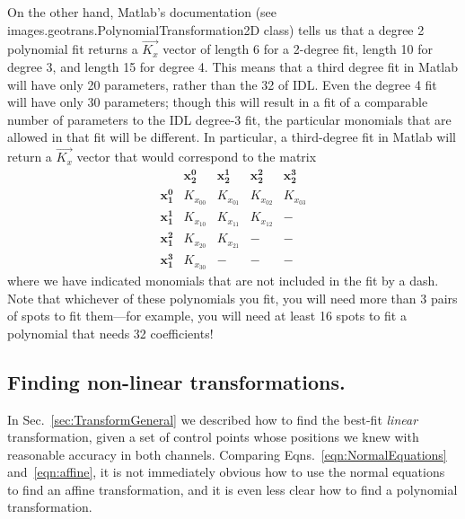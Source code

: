 \documentclass[11pt]{article}
\begin{document}
On the other hand, Matlab's documentation (see images.geotrans.PolynomialTransformation2D class) tells us that a degree 2 polynomial fit returns a $\vec{K_x}$ vector of length 6 for a 2-degree fit, length 10 for degree 3, and length 15 for degree 4.  This means that a third degree fit in Matlab will have only 20 parameters, rather than the 32 of IDL.  Even the degree 4 fit will have only 30 parameters; though this will result in a fit of a comparable number of parameters to the IDL degree-3 fit, the particular monomials that are allowed in that fit will be different.  In particular, a third-degree fit in Matlab will return a $\vec{K_x}$ vector that would correspond to the matrix
\begin{equation}
 \begin{matrix} 
            & \mathbf{x_2^0}         & \mathbf{x_2^1} & \mathbf{x_2^2}  & \mathbf{x_2^3} \\
\mathbf{x_1^0} & K_{x_{00}} & K_{x_{01}} & K_{x_{02}} & K_{x_{03}} \\
\mathbf{x_1^1} & K_{x_{10}} & K_{x_{11}} & K_{x_{12}} & - \\
\mathbf{x_1^2} & K_{x_{20}} & K_{x_{21}} & - & - \\
\mathbf{x_1^3} & K_{x_{30}} & - & - & -
\end{matrix} 
\end{equation}
where we have indicated monomials that are not included in the fit by a dash.  Note that whichever of these polynomials you fit, you will need more than 3 pairs of spots to fit them---for example, you will need at least 16 spots to fit a polynomial that needs 32 coefficients!


\subsection{Finding non-linear transformations.}

In Sec.~\ref{sec:TransformGeneral} we described how to find the best-fit {\it linear} transformation, given a set of control points whose positions we knew with reasonable accuracy in both channels. Comparing Eqns.~\eqref{eqn:NormalEquations} and~\eqref{eqn:affine}, it is not immediately obvious how to use the normal equations to find an affine transformation, and it is even less clear how to find a polynomial transformation.
\end{document}
